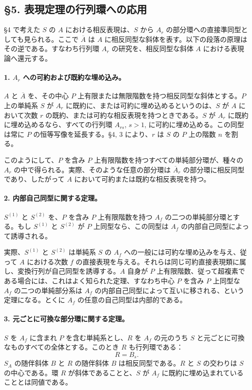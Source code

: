 \subsection*{§5. 表現定理の行列環への応用}

§4 で考えた \(S\) の \(A\) における相反表現は、\(S\) から \(A_r\) の部分環への直接準同型としても見られる。ここで \(\overline A\) は \(A\) に相反同型な斜体を表す。以下の段落の原理はその逆である。すなわち行列環 \(A_r\) の研究を、相反同型な斜体 \(A\) における表現論へ還元する。

\paragraph{1. \(A_r\) への可約および既約な埋め込み。}
\(A\) と \(\overline A\) を、その中心 \(P\) 上有限または無限階数を持つ相反同型な斜体とする。\(P\) 上の単純系 \(S\) が \(A_r\) に既約に、または可約に埋め込めるというのは、\(S\) が \(A\) において次数 \(r\) の既約、または可約な相反表現を持つときである。\(S\) が \(A_r\) に既約に埋め込めるなら、すべての行列環 \(A_{rs}\), \(s>1\), に可約に埋め込める。この同型は常に \(P\) の恒等写像を延長する。§4, 3 により、\(r\) は \(S\) の \(P\) 上の階数 \(n\) を割る。

このようにして、\(P\) を含み \(P\) 上有限階数を持つすべての単純部分環が、種々の \(A_r\) の中で得られる。実際、そのような任意の部分環は \(\overline A_r\) の部分環に相反同型であり、したがって \(A\) において可約または既約な相反表現を持つ。

\paragraph{2. 内部自己同型に関する定理。}
\(S^{(1)}\) と \(S^{(2)}\) を、\(P\) を含み \(P\) 上有限階数を持つ \(A_f\) の二つの単純部分環とする。もし \(S^{(1)}\) と \(S^{(2)}\) が \(P\) 上同型なら、この同型は \(A_f\) の内部自己同型によって誘導される。

実際、\(S^{(1)}\) と \(S^{(2)}\) は単純系 \(S\) の \(A_f\) への一般には可約な埋め込みを与え、従って \(A\) における次数 \(f\) の直接表現を与える。それらは同じ可約直接表現類に属し、変換行列が自己同型を誘導する。\(A\) 自身が \(P\) 上有限階数、従って超複素である場合には、これはよく知られた定理、すなわち中心 \(P\) を含み \(P\) 上同型な \(A_f\) の二つの単純部分系は \(A_f\) の内部自己同型によって互いに移される、という定理になる。とくに \(A_f\) の任意の自己同型は内部的である。

\paragraph{3. 元ごとに可換な部分環に関する定理。}
\(S\) を \(A_f\) に含まれ \(P\) を含む単純系とし、\(R\) を \(A_f\) の元のうち \(S\) と元ごとに可換なものすべての全体とする。このとき \(R\) も行列環である：
\[
        R=B_s.
\]
\(S_A\) の随伴斜体 \(B\) と \(R\) の随伴斜体 \(B\) は相反同型である。\(R\) と \(S\) の交わりは \(S\) の中心である。環 \(R\) が斜体であることと、\(S\) が \(A_f\) に既約に埋め込まれていることとは同値である。

